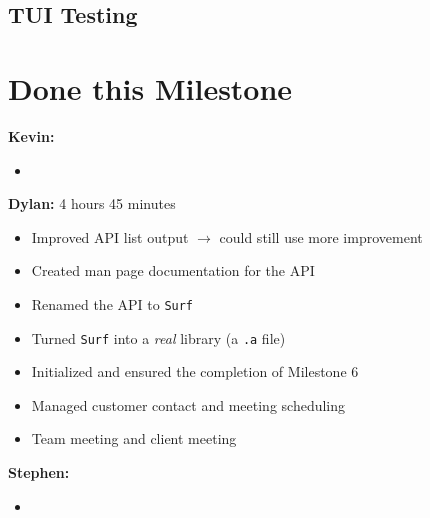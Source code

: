 \documentclass[11pt]{article}
\begin{document}
\subsection*{TUI Testing}

\section*{Done this Milestone}

\textbf{Kevin:}
\begin{itemize}
  \item
\end{itemize}

\textbf{Dylan:} 4 hours 45 minutes
\begin{itemize}
  \item Improved API list output $\rightarrow$ could still use more improvement
  \item Created man page documentation for the API
  \item Renamed the API to \texttt{Surf}
  \item Turned \texttt{Surf} into a \textit{real} library (a \texttt{.a} file)
  \item Initialized and ensured the completion of Milestone 6
  \item Managed customer contact and meeting scheduling
  \item Team meeting and client meeting
\end{itemize}

\textbf{Stephen:}
\begin{itemize}
  \item
\end{itemize}
\end{document}
